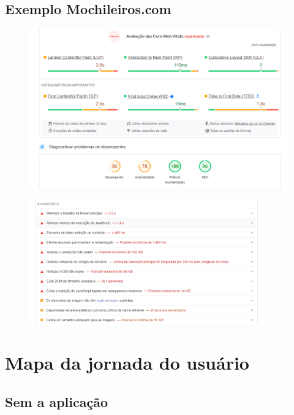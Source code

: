 \documentclass{article}
\begin{document}
\subsection{Exemplo Mochileiros.com}

\begin{figure}[h]
      \centering
      \includegraphics [width=1\textwidth]{IMGDOC/AnaliseMochileiros1.png}
      \label{fig:imagem}
\end{figure}
\begin{figure}[h]
      \centering
      \includegraphics [width=0.9\textwidth]{IMGDOC/AnaliseMochileiros2.png}
      \label{fig:imagem}
\end{figure}

\section{Mapa da jornada do usuário}
\subsection{Sem a aplicação}
\end{document}

